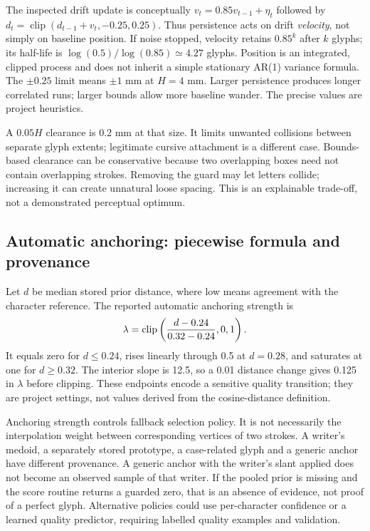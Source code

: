 The inspected drift update is conceptually
$v_t=0.85v_{t-1}+\eta_t$ followed by
$d_t=\operatorname{clip}(d_{t-1}+v_t,-0.25,0.25)$.
Thus persistence acts on drift \emph{velocity}, not simply on baseline
position. If noise stopped, velocity retains $0.85^k$ after $k$ glyphs;
its half-life is $\log(0.5)/\log(0.85)\simeq4.27$ glyphs.
Position is an integrated, clipped process and does not inherit a simple
stationary AR(1) variance formula. The $\pm0.25$ limit means $\pm1$ mm
at $H=4$ mm. Larger persistence produces longer correlated runs; larger
bounds allow more baseline wander. The precise values are project heuristics.

A $0.05H$ clearance is 0.2 mm at that size. It limits unwanted collisions
between separate glyph extents; legitimate cursive attachment is a different
case. Bounds-based clearance can be conservative because two overlapping
boxes need not contain overlapping strokes. Removing the guard may let
letters collide; increasing it can create unnatural loose spacing. This is
an explainable trade-off, not a demonstrated perceptual optimum.

\subsection{Automatic anchoring: piecewise formula and provenance}
Let $d$ be median stored prior distance, where low means agreement with
the character reference. The reported automatic anchoring strength is
\[
\lambda=\operatorname{clip}\left({d-0.24\over0.32-0.24},0,1\right).
\]
It equals zero for $d\le0.24$, rises linearly through 0.5 at $d=0.28$,
and saturates at one for $d\ge0.32$. The interior slope is 12.5, so a
0.01 distance change gives 0.125 in $\lambda$ before clipping. These endpoints
encode a sensitive quality transition; they are project settings, not values
derived from the cosine-distance definition.

Anchoring strength controls fallback selection policy. It is not necessarily
the interpolation weight between corresponding vertices of two strokes.
A writer's medoid, a separately stored prototype, a case-related glyph and a generic anchor
have different provenance. A generic anchor with the writer's slant applied
does not become an observed sample of that writer. If the pooled prior is
missing and the score routine returns a guarded zero, that is an absence of
evidence, not proof of a perfect glyph. Alternative policies could use
per-character confidence or a learned quality predictor, requiring labelled
quality examples and validation.

